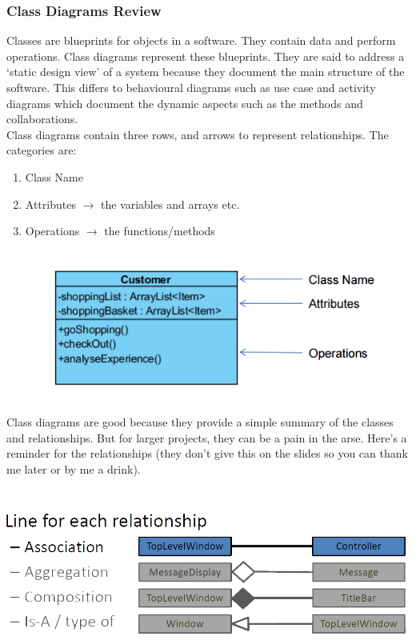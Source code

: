 \documentclass{article}
\begin{document}
\subsubsection{Class Diagrams Review}
Classes are blueprints for objects in a software. They contain data and perform operations. Class diagrams represent these blueprints. They are said to address a `static design view' of a system because they document the main structure of the software. This differs to behavioural diagrams such as use case and activity diagrams which document the dynamic aspects such as the methods and collaborations.
\\
Class diagrams contain three rows, and arrows to represent relationships. The categories are:
\begin{enumerate}
    \item Class Name 
    \item Attributes $\longrightarrow$ the variables and arrays etc.
    \item Operations $\longrightarrow$ the functions/methods
\end{enumerate}

\includegraphics[scale = 0.6]{class1} %

\newpage
Class diagrams are good because they provide a simple summary of the classes and relationships. But for larger projects, they can be a pain in the arse. Here's a reminder for the relationships (they don't give this on the slides so you can thank me later or by me a drink).
\\\\\\ %
\includegraphics[scale = 0.35]{classRelationships}
\end{document}
